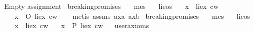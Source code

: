 \begin{isabellebody}
{  Empty assignment%
}\isanewline
%
%
\endisatagproof
{\isafoldproof}%
%
\isadelimproof
%
\endisadelimproof
%
\isadelimdocument
%
\endisadelimdocument
%
\isatagdocument
%
\isamarkuptrue%
%
\endisatagdocument
{\isafolddocument}%
%
\isadelimdocument
%
\endisadelimdocument
{}\isamarkupfalse%
\ breaking{\isacharunderscore}promises{\isacharcolon}\isanewline
\ \ \ me{\isacharcolon}{\isacharcolon}s\isanewline
\ \ \ lie{\isacharcolon}{\isacharcolon}os\isanewline
\ \ \ {\isachardoublequoteopen}{\isasymexists}x{\isachardot}\ {\isacharparenleft}\isactrlbold {\isasymnot}\ {\isacharparenleft}{\isasymdiamond}{\isacharparenleft}lie{\isacharparenleft}x{\isacharparenright}{\isacharparenright}{\isacharparenright}\ cw{\isacharparenright}{\isachardoublequoteclose}\isanewline
\ \ \ {\isachardoublequoteopen}{\isasymexists}x{\isachardot}\ {\isacharparenleft}\isactrlbold {\isasymnot}\ {\isacharparenleft}O\ {\isacharbraceleft}lie{\isacharparenleft}x{\isacharparenright}{\isacharbraceright}{\isacharparenright}{\isacharparenright}\ cw{\isachardoublequoteclose}\isanewline
%
\isadelimproof
\ \ %
\endisadelimproof
%
\isatagproof
{}\isamarkupfalse%
\ {\isacharparenleft}metis\ assms\ ax{\isacharunderscore}{}a\ ax{\isacharunderscore}{}b{\isacharparenright}%
\endisatagproof
{\isafoldproof}%
%
\isadelimproof
\isanewline
%
\endisadelimproof
\isanewline
\isanewline
{}\isamarkupfalse%
\ breaking{\isacharunderscore}promises{\isacharcolon}\isanewline
\ \ \ me{\isacharcolon}{\isacharcolon}s\isanewline
\ \ \ lie{\isacharcolon}{\isacharcolon}os\isanewline
\ \ \ {\isachardoublequoteopen}{\isasymexists}x{\isachardot}\ {\isacharparenleft}\isactrlbold {\isasymnot}\ {\isacharparenleft}{\isasymdiamond}{\isacharparenleft}lie{\isacharparenleft}x{\isacharparenright}{\isacharparenright}{\isacharparenright}\ cw{\isacharparenright}{\isachardoublequoteclose}\isanewline
\ \ \ {\isachardoublequoteopen}{\isasymexists}x{\isachardot}\ {\isacharparenleft}\isactrlbold {\isasymnot}\ {\isacharparenleft}P\ {\isacharbraceleft}lie{\isacharparenleft}x{\isacharparenright}{\isacharbraceright}{\isacharparenright}{\isacharparenright}\ cw{\isachardoublequoteclose}\isanewline
\ \ \isamarkupfalse%
{\isacharbrackleft}user{\isacharunderscore}axioms{\isacharbrackright}%
\isadelimproof
\ %
\endisadelimproof
%
\isatagproof
{}\isamarkupfalse%
%
\endisatagproof
{\isafoldproof}%
%
\isadelimproof
%
\endisadelimproof
%
\isadelimdocument
%
\endisadelimdocument
%
\isatagdocument
%
\isamarkuptrue%
%
\isamarkuptrue%
%
\endisatagdocument
{\isafolddocument}%
%
\isadelimdocument
%
\endisadelimdocument
%
\isadelimtheory
%
\endisadelimtheory
%
\isatagtheory
{}\isamarkupfalse%
%
\endisatagtheory
{\isafoldtheory}%
%
\isadelimtheory
%
\endisadelimtheory
%
\end{isabellebody}%
